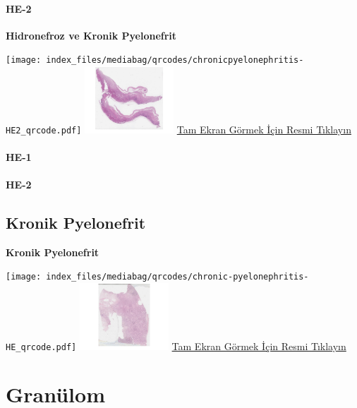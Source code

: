 \documentclass[
  letterpaper,
  DIV=11,
  numbers=noendperiod]{scrreprt}
\begin{document}
\subsubsection{HE-2}\label{he-2-2}

\textbf{Hidronefroz ve Kronik Pyelonefrit}

\texttt{[image: index\_files/mediabag/qrcodes/chronicpyelonephritis-HE2\_qrcode.pdf]}
\href{https://images.patolojiatlasi.com/chronicpyelonephritis/HE2.html}{\includegraphics[width=0.25\textwidth,height=\textheight]{./screenshots/thumbnail_chronicpyelonephritis-2.png}}
\href{https://images.patolojiatlasi.com/chronicpyelonephritis/HE2.html}{Tam
Ekran Görmek İçin Resmi Tıklayın}

\subsubsection{HE-1}\label{he-1-3}

\subsubsection{HE-2}\label{he-2-3}

\section{Kronik Pyelonefrit}\label{sec-kronik-pyelonefrit}

\textbf{Kronik Pyelonefrit}

\texttt{[image: index\_files/mediabag/qrcodes/chronic-pyelonephritis-HE\_qrcode.pdf]}
\href{https://images.patolojiatlasi.com/chronic-pyelonephritis/HE.html}{\includegraphics[width=0.25\textwidth,height=\textheight]{./screenshots/thumbnail_chronic-pyelonephritis.png}}
\href{https://images.patolojiatlasi.com/chronic-pyelonephritis/HE.html}{Tam
Ekran Görmek İçin Resmi Tıklayın}

\chapter{Granülom}\label{sec-granulom}
\end{document}
